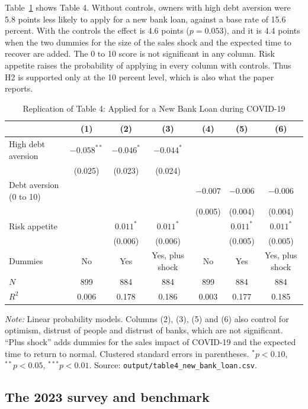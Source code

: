 \documentclass[preprint,letterpaper,11pt,authoryear]{elsarticle}
\newenvironment{tablenotes}{\par\vspace{3pt}\begin{minipage}{0.95\linewidth}\footnotesize\textit{Note:} }{\end{minipage}}
\begin{document}
Table~\ref{tab:t4} shows Table 4. Without controls, owners with high debt aversion were 5.8 points less likely to apply for a new bank loan, against a base rate of 15.6 percent. With the controls the effect is 4.6 points ($p = 0.053$), and it is 4.4 points when the two dummies for the size of the sales shock and the expected time to recover are added. The 0 to 10 score is not significant in any column. Risk appetite raises the probability of applying in every column with controls. Thus H2 is supported only at the 10 percent level, which is also what the paper reports.

\begin{table}[!htbp]
\centering\small\setlength{\tabcolsep}{4pt}
\caption{Replication of Table 4: Applied for a New Bank Loan during COVID-19}
\label{tab:t4}
\begin{tabular}{lcccccc}
\toprule
 & (1) & (2) & (3) & (4) & (5) & (6) \\
\midrule
High debt aversion & $-0.058^{**}$ & $-0.046^{*}$ & $-0.044^{*}$ & & & \\
 & (0.025) & (0.023) & (0.024) & & & \\
Debt aversion (0 to 10) & & & & $-0.007$ & $-0.006$ & $-0.006$ \\
 & & & & (0.005) & (0.004) & (0.004) \\
Risk appetite & & $0.011^{*}$ & $0.011^{*}$ & & $0.011^{*}$ & $0.011^{*}$ \\
 & & (0.006) & (0.006) & & (0.005) & (0.005) \\
\midrule
Dummies & No & Yes & Yes, plus shock & No & Yes & Yes, plus shock \\
$N$ & 899 & 884 & 884 & 899 & 884 & 884 \\
$R^2$ & 0.006 & 0.178 & 0.186 & 0.003 & 0.177 & 0.185 \\
\bottomrule
\end{tabular}
\begin{tablenotes}
Linear probability models. Columns (2), (3), (5) and (6) also control for optimism, distrust of people and distrust of banks, which are not significant. ``Plus shock'' adds dummies for the sales impact of COVID-19 and the expected time to return to normal. Clustered standard errors in parentheses. $^{*}p<0.10$, $^{**}p<0.05$, $^{***}p<0.01$. Source: \texttt{output/table4\_new\_bank\_loan.csv}.
\end{tablenotes}
\end{table}

\subsection{The 2023 survey and benchmark}
\end{document}
